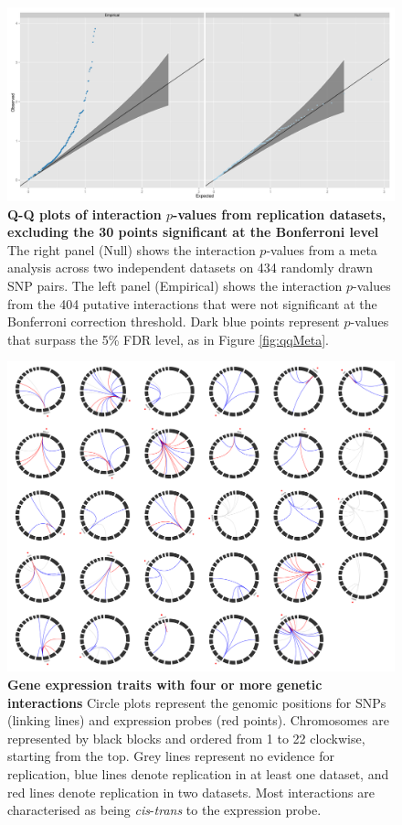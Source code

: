 \documentclass{article}
\begin{document}
\begin{figure}[H]
	\centering
	\includegraphics[width=5in]{qqMetaNonsig}
	\caption{\textbf{Q-Q plots of interaction $p$-values from replication datasets, excluding the 30 points significant at the Bonferroni level} The right panel (Null) shows the interaction $p$-values from a meta analysis across two independent datasets on 434 randomly drawn SNP pairs. The left panel (Empirical) shows the interaction $p$-values from the 404 putative interactions that were not significant at the Bonferroni correction threshold. Dark blue points represent $p$-values that surpass the 5\% FDR level, as in Figure \ref{fig:qqMeta}.}
\label{fig:qqMetaNonsig}
\end{figure}
\clearpage

\begin{figure}
	\centering
	\includegraphics[width=5in]{circles_replication2}
	\caption{\textbf{Gene expression traits with four or more genetic interactions} Circle plots represent the genomic positions for SNPs (linking lines) and expression probes (red points). Chromosomes are represented by black blocks and ordered from 1 to 22 clockwise, starting from the top. Grey lines represent no evidence for replication, blue lines denote replication in at least one dataset, and red lines denote replication in two datasets. Most interactions are characterised as being \emph{cis}-\emph{trans} to the expression probe.}
	\label{fig:circleplots}
\end{figure}
\clearpage
\end{document}
